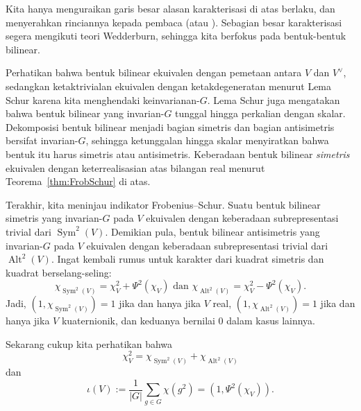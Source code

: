 \documentclass[12pt]{article}
\theoremstyle{plain}
\theoremstyle{definition}
\theoremstyle{remark}
\numberwithin{equation}{section}
\begin{document}
Kita hanya menguraikan garis besar alasan karakterisasi di atas berlaku,
dan menyerahkan rinciannya kepada pembaca (atau \cite[\S{13.2}]{Serre}).
Sebagian besar karakterisasi segera mengikuti teori Wedderburn,
sehingga kita berfokus pada bentuk-bentuk bilinear.

Perhatikan bahwa bentuk bilinear ekuivalen dengan pemetaan antara $V$ dan
$V^\vee$, sedangkan ketaktrivialan ekuivalen dengan ketakdegeneratan menurut
Lema Schur karena kita menghendaki keinvarianan-$G$.
Lema Schur juga mengatakan bahwa bentuk bilinear yang invarian-$G$
tunggal hingga perkalian dengan skalar.
Dekomposisi bentuk bilinear menjadi bagian simetris dan bagian antisimetris
bersifat invarian-$G$, sehingga ketunggalan hingga skalar menyiratkan bahwa bentuk itu
harus simetris atau antisimetris.
Keberadaan bentuk bilinear \emph{simetris} ekuivalen dengan keterrealisasian atas
bilangan real menurut Teorema~\ref{thm:FrobSchur} di atas.

Terakhir, kita meninjau indikator Frobenius--Schur.
Suatu bentuk bilinear simetris yang invarian-$G$ pada $V$ ekuivalen dengan
keberadaan subrepresentasi trivial dari $\operatorname{Sym}^2(V)$.
Demikian pula, bentuk bilinear antisimetris yang invarian-$G$ pada $V$
ekuivalen dengan keberadaan subrepresentasi trivial dari
$\operatorname{Alt}^2(V)$.
Ingat kembali rumus untuk karakter dari
kuadrat simetris dan kuadrat berselang-seling:
\[
\chi_{\operatorname{Sym}^2(V)} = \chi_V^2 + \Psi^2(\chi_V)
\textrm{ dan }
\chi_{\operatorname{Alt}^2(V)} = \chi_V^2 - \Psi^2(\chi_V).
\]
Jadi, $(1,\chi_{\operatorname{Sym}^2(V)})=1$ jika dan hanya jika $V$ real,
$(1,\chi_{\operatorname{Alt}^2(V)})=1$ jika dan hanya jika $V$ kuaternionik,
dan keduanya bernilai $0$ dalam kasus lainnya.

Sekarang cukup kita perhatikan bahwa
\[
\chi_V^2 = \chi_{\operatorname{Sym}^2(V)} + \chi_{\operatorname{Alt}^2(V)}
\]
dan
\[
\iota(V) := \frac{1}{|G|}\sum_{g \in G} \chi(g^2)
=(1, \Psi^2(\chi_V)).
\]



\end{document}
